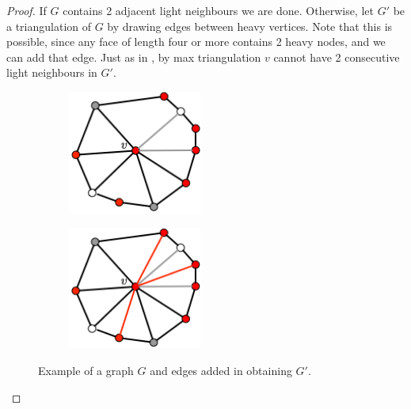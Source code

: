 \documentclass{article}
\newcommand{\0}{\mathbb{0}}
\newcommand{\1}{\mathbb{1}}
\begin{document}
\begin{proof}
 If $G$ contains  2 adjacent light neighbours we are done. Otherwise, let $G'$ be a triangulation of $G$ by drawing edges between heavy vertices. Note that this is possible, since any face of length four or more contains 2 heavy nodes, and we can add that edge.  Just as in \cite{JV13}, by max triangulation $v$ cannot have 2 consecutive light neighbours in $G'$.

\begin{figure}
   \begin{center}
    \hspace*{.2\textwidth}
      \begin{subfigure}[t]{.48\textwidth}
        \includegraphics[width=0.48\textwidth]{UntriangulatedDual.png}
         \end{subfigure} 
    \hspace*{-.18\textwidth}
      \begin{subfigure}[t]{0.48\textwidth}
      \includegraphics[width=0.48\textwidth]{TriangulatedDual.png}
    \end{subfigure}
    \end{center}
  \caption{\label{Triangulating} Example of a graph $G$ and edges added in obtaining $G'$.} 
\end{figure}


\end{proof}
\end{document}
